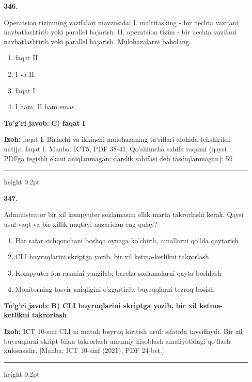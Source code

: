 \documentclass[10pt,a4paper]{article}
\begin{document}
{\bfseries\sffamily\color{ink} 346.}
\par
Operatsion tizimning vazifalari mavzusida: I. multitasking - bir nechta vazifani navbatlashtirib yoki parallel bajarish. II. operatsion tizim - bir nechta vazifani navbatlashtirib yoki parallel bajarish. Mulohazalarni baholang.
\begin{enumerate}[label=\Alph*),leftmargin=9mm]
\item faqat II
\item I va II
\item faqat I
\item I ham, II ham emas
\end{enumerate}
\begin{tcolorbox}[enhanced,breakable,colback=teal!4,colframe=teal!60!black,boxrule=0.45pt,arc=1.2mm,left=2.7mm,right=2.7mm,top=1.8mm,bottom=1.8mm,before skip=2mm,after skip=2mm]
{\bfseries\sffamily\color{teal}To'g'ri javob:} \textbf{C) faqat I}
\par\smallskip
{\bfseries Izoh:} faqat I. Birinchi va ikkinchi mulohazaning ta'riflari alohida tekshirildi; natija: faqat I. Manba: ICT5, PDF 38-41; Qo'shimcha sahifa raqami (qaysi PDFga tegishli ekani aniqlanmagan; darslik sahifasi deb tasdiqlanmagan): 59
\end{tcolorbox}
\vspace{2mm}\hrule height 0.2pt\vspace{3mm}

{\bfseries\sffamily\color{ink} 347.}
\par
Administrator bir xil kompyuter sozlamasini ellik marta takrorlashi kerak. Qaysi usul vaqt va bir xillik nuqtayi nazaridan eng qulay?
\begin{enumerate}[label=\Alph*),leftmargin=9mm]
\item Har safar sichqonchani boshqa oynaga ko'chirib, amallarni qo'lda qaytarish
\item CLI buyruqlarini skriptga yozib, bir xil ketma-ketlikni takrorlash
\item Kompyuter fon rasmini yangilab, barcha sozlamalarni qayta boshlash
\item Monitorning tasvir aniqligini o'zgartirib, buyruqlarni tezroq bosish
\end{enumerate}
\begin{tcolorbox}[enhanced,breakable,colback=teal!4,colframe=teal!60!black,boxrule=0.45pt,arc=1.2mm,left=2.7mm,right=2.7mm,top=1.8mm,bottom=1.8mm,before skip=2mm,after skip=2mm]
{\bfseries\sffamily\color{teal}To'g'ri javob:} \textbf{B) CLI buyruqlarini skriptga yozib, bir xil ketma-ketlikni takrorlash}
\par\smallskip
{\bfseries Izoh:} ICT 10-sinf CLI ni matnli buyruq kiritish usuli sifatida tavsiflaydi. Bir xil buyruqlarni skript bilan takrorlash umumiy hisoblash amaliyotidagi qo'llash xulosasidir. [Manba: ICT 10-sinf (2021), PDF 24-bet.]
\end{tcolorbox}
\vspace{2mm}\hrule height 0.2pt\vspace{3mm}
\end{document}
